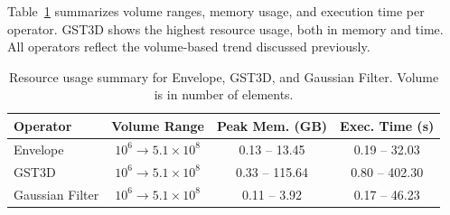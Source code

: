 Table~\ref{tab:operator_summary_aggregates} summarizes volume ranges, memory usage, and execution time per operator.
\ac{GST3D} shows the highest resource usage, both in memory and time.
All operators reflect the volume-based trend discussed previously.

\begin{table}[htbp]
    \centering
    \begin{tabular}{lccc}
        \hline
        \textbf{Operator} & \textbf{Volume Range}    & \textbf{Peak Mem. (GB)} & \textbf{Exec. Time (s)} \\
        \hline
        Envelope          & $10^6 \to 5.1\times10^8$ & 0.13 – 13.45            & 0.19 – 32.03            \\
        \ac{GST3D}        & $10^6 \to 5.1\times10^8$ & 0.33 – 115.64           & 0.80 – 402.30           \\
        Gaussian Filter   & $10^6 \to 5.1\times10^8$ & 0.11 – 3.92             & 0.17 – 46.23            \\
        \hline
    \end{tabular}
    \caption{Resource usage summary for Envelope, \ac{GST3D}, and Gaussian Filter. Volume is in number of elements.}
    \label{tab:operator_summary_aggregates}
\end{table}